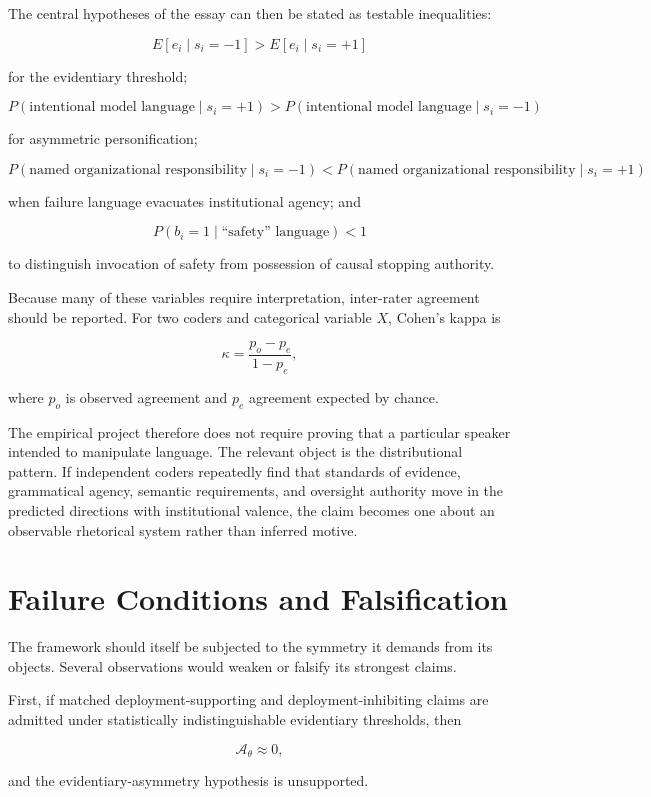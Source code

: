 \documentclass[11pt]{article}
\begin{document}
The central hypotheses of the essay can then be stated as testable
inequalities:

\[
E[e_i\mid s_i=-1]
>
E[e_i\mid s_i=+1]
\]

for the evidentiary threshold;

\[
P(\text{intentional model language}\mid s_i=+1)
>
P(\text{intentional model language}\mid s_i=-1)
\]

for asymmetric personification;

\[
P(\text{named organizational responsibility}\mid s_i=-1)
<
P(\text{named organizational responsibility}\mid s_i=+1)
\]

when failure language evacuates institutional agency; and

\[
P(b_i=1\mid\text{``safety'' language})
<
1
\]

to distinguish invocation of safety from possession of causal stopping
authority.

Because many of these variables require interpretation, inter-rater agreement
should be reported. For two coders and categorical variable \(X\), Cohen's
kappa is

\[
\kappa
=
\frac{p_o-p_e}{1-p_e},
\]

where \(p_o\) is observed agreement and \(p_e\) agreement expected by chance.

The empirical project therefore does not require proving that a particular
speaker intended to manipulate language. The relevant object is the
distributional pattern. If independent coders repeatedly find that standards
of evidence, grammatical agency, semantic requirements, and oversight
authority move in the predicted directions with institutional valence, the
claim becomes one about an observable rhetorical system rather than inferred
motive.


\section{Failure Conditions and Falsification}

The framework should itself be subjected to the symmetry it demands from its
objects. Several observations would weaken or falsify its strongest claims.

First, if matched deployment-supporting and deployment-inhibiting claims are
admitted under statistically indistinguishable evidentiary thresholds, then

\[
\mathcal A_\theta\approx0,
\]

and the evidentiary-asymmetry hypothesis is unsupported.
\end{document}

